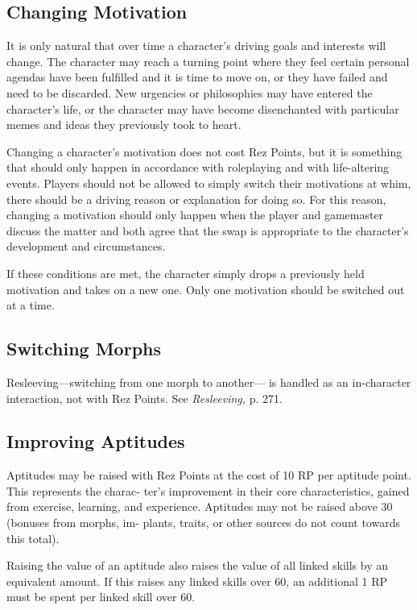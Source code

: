 \subsection{Changing Motivation}

It is only natural that over time a character's driving 
goals and interests will change. The character may 
reach a turning point where they feel certain personal 
agendas have been fulfilled and it is time to move on, 
or they have failed and need to be discarded. New 
urgencies or philosophies may have entered the 
character's life, or the character may have become 
disenchanted with particular memes and ideas they 
previously took to heart.

Changing a character's motivation does not cost 
Rez Points, but it is something that should only 
happen in accordance with roleplaying and with 
life-altering events. Players should not be allowed 
to simply switch their motivations at whim, there 
should be a driving reason or explanation for doing 
so. For this reason, changing a motivation should only 
happen when the player and gamemaster discuss the 
matter and both agree that the swap is appropriate to 
the character's development and circumstances.

If these conditions are met, the character simply 
drops a previously held motivation and takes on a 
new one. Only one motivation should be switched 
out at a time.

\subsection{Switching Morphs}

Resleeving—switching from one morph to another—
is handled as an in-character interaction, not with Rez 
Points. See \textit{Resleeving,} p. 271.

\subsection{Improving Aptitudes}

Aptitudes may be raised with Rez Points at the cost of 
10 RP per aptitude point. This represents the charac-
ter's improvement in their core characteristics, gained 
from exercise, learning, and experience. Aptitudes may 
not be raised above 30 (bonuses from morphs, im-
plants, traits, or other sources do not count towards 
this total).

Raising the value of an aptitude also raises the 
value of all linked skills by an equivalent amount. If 
this raises any linked skills over 60, an additional 1 
RP must be spent per linked skill over 60.


